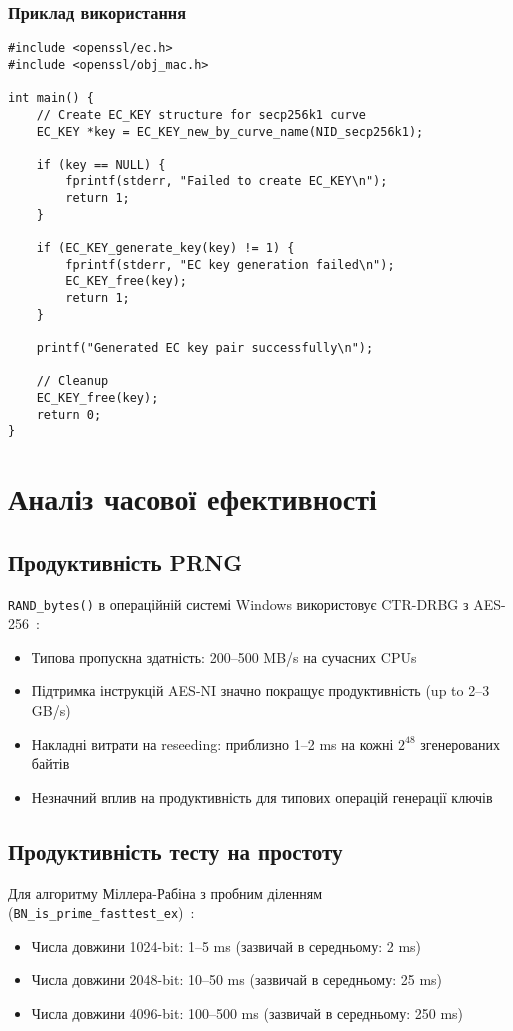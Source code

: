 \subsubsection{Приклад використання}
\begin{verbatim}
#include <openssl/ec.h>
#include <openssl/obj_mac.h>

int main() {
    // Create EC_KEY structure for secp256k1 curve
    EC_KEY *key = EC_KEY_new_by_curve_name(NID_secp256k1);
    
    if (key == NULL) {
        fprintf(stderr, "Failed to create EC_KEY\n");
        return 1;
    }
    
    if (EC_KEY_generate_key(key) != 1) {
        fprintf(stderr, "EC key generation failed\n");
        EC_KEY_free(key);
        return 1;
    }
    
    printf("Generated EC key pair successfully\n");
    
    // Cleanup
    EC_KEY_free(key);
    return 0;
}
\end{verbatim}

\section{Аналіз часової ефективності}

\subsection{Продуктивність PRNG}
\texttt{RAND\_bytes()} в операційній системі Windows використовує CTR-DRBG з AES-256~\cite{barker2015recommendation}:
\begin{itemize}
    \item Типова пропускна здатність: 200--500 MB/s на сучасних CPUs
    \item Підтримка інструкцій AES-NI значно покращує продуктивність (up to 2--3 GB/s)
    \item Накладні витрати на reseeding: приблизно 1--2 ms на кожні $2^{48}$ згенерованих байтів
    \item  Незначний вплив на продуктивність для типових операцій генерації ключів
\end{itemize}

\subsection{Продуктивність тесту на простоту}
Для алгоритму Міллера-Рабіна з пробним діленням (\texttt{BN\_is\_prime\_fasttest\_ex})~\cite{crandall2005prime}:
\begin{itemize}
    \item Числа довжини 1024-bit: 1--5 ms (зазвичай в середньому: 2 ms)
    \item Числа довжини 2048-bit: 10--50 ms (зазвичай в середньому: 25 ms)
    \item Числа довжини 4096-bit: 100--500 ms (зазвичай в середньому: 250 ms)
\end{itemize}

